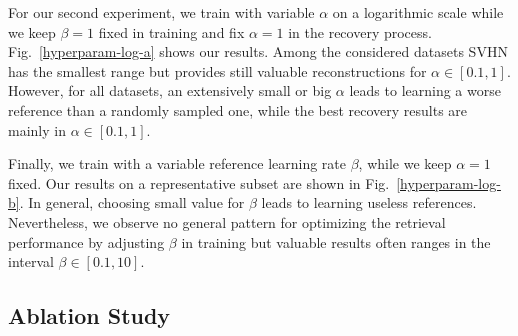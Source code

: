 For our second experiment, we train with variable $\alpha$ on a logarithmic scale
while we keep $\beta=1$ fixed in training and fix $\alpha = 1$ in the
recovery process. Fig.~\ref{hyperparam-log-a} shows our results. Among
the considered datasets SVHN has the smallest range but provides still
valuable reconstructions for $\alpha \in [0.1, 1]$. However, for all
datasets, an extensively small or big $\alpha$ leads to learning a worse reference than a randomly sampled one, while the best recovery results are mainly in $\alpha \in [0.1, 1]$.

Finally, we train with a variable reference learning rate $\beta$, while we keep $\alpha=1$ fixed. Our results on a
representative subset are shown in Fig.~\ref{hyperparam-log-b}. In
general, choosing small value for $\beta$ leads to learning useless references. Nevertheless, we observe no general pattern for optimizing the retrieval performance by adjusting $\beta$ in training
but valuable results often ranges in the interval $\beta \in [0.1,10]$.


\subsection{Ablation Study}

